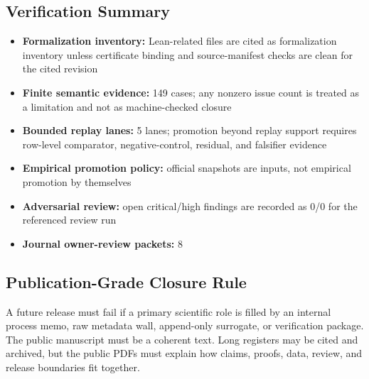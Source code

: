 \subsection{Verification Summary}

\begin{itemize}[leftmargin=1.8em]

\item \textbf{Formalization inventory:} Lean-related files are cited as formalization inventory unless certificate binding and source-manifest checks are clean for the cited revision

\item \textbf{Finite semantic evidence:} 149 cases; any nonzero issue count is treated as a limitation and not as machine-checked closure

\item \textbf{Bounded replay lanes:} 5 lanes; promotion beyond replay support requires row-level comparator, negative-control, residual, and falsifier evidence

\item \textbf{Empirical promotion policy:} official snapshots are inputs, not empirical promotion by themselves

\item \textbf{Adversarial review:} open critical/high findings are recorded as 0/0 for the referenced review run

\item \textbf{Journal owner-review packets:} 8

\end{itemize}

\subsection{Publication-Grade Closure Rule}

A future release must fail if a primary scientific role is filled by an internal process memo, raw metadata wall, append-only surrogate, or verification package. The public manuscript must be a coherent text. Long registers may be cited and archived, but the public PDFs must explain how claims, proofs, data, review, and release boundaries fit together.
